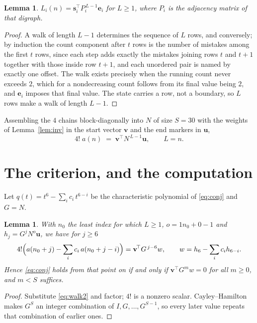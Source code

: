 \documentclass[11pt,a4paper]{article}
\theoremstyle{plain}
\newtheorem{lemma}[theorem]{Lemma}
\theoremstyle{definition}
\begin{document}
\begin{lemma}\label{lem:walk}
$L_i(n)=\mathbf{s}_i^{\!\top}P_i^{\,L-1}\mathbf{e}_i$ for $L\ge1$, where $P_i$ is the
adjacency matrix of that digraph.
\end{lemma}

\begin{proof}
A walk of length $L-1$ determines the sequence of $L$ rows, and conversely; by induction
the count component after $t$ rows is the number of mistakes among the first $t$ rows,
since each step adds exactly the mistakes joining rows $t$ and $t+1$ together with those
inside row $t+1$, and each unordered pair is named by exactly one offset. The walk exists
precisely when the running count never exceeds $2$, which for a nondecreasing count follows
from its final value being $2$, and $\mathbf{e}_i$ imposes that final value. The state
carries a row, not a boundary, so $L$ rows make a walk of length $L-1$.
\end{proof}

Assembling the $4$ chains block-diagonally into $N$ of size $S=30$ with the weights of
Lemma~\ref{lem:inv} in the start vector $\mathbf{v}$ and the end markers in
$\mathbf{u}$,
\begin{equation}\label{eq:walk2}
4!\;a(n)\;=\;\mathbf{v}^{\!\top}N^{\,L-1}\mathbf{u},\qquad L=n .
\end{equation}

\section{The criterion, and the computation}

Let $q(t)=t^{6}-\sum_i c_i\,t^{6-i}$ be the characteristic polynomial of
\eqref{eq:conj} and $G=N$.

\begin{lemma}\label{lem:crit}
With $n_0$ the least index for which $L\ge1$, $o=1n_0+0-1$ and
$h_j=G^{j}N^{o}\mathbf{u}$, we have for $j\ge6$
\[
4!\Bigl(a(n_0+j)-\sum_i c_i\,a(n_0+j-i)\Bigr)=\mathbf{v}^{\!\top}G^{\,j-6}w,
\qquad w=h_{6}-\sum_i c_ih_{6-i} .
\]
Hence \eqref{eq:conj} holds from that point on if and only if
$\mathbf{v}^{\!\top}G^{m}w=0$ for all $m\ge0$, and $m<S$ suffices.
\end{lemma}

\begin{proof}
Substitute \eqref{eq:walk2} and factor; $4!$ is a nonzero scalar. Cayley--Hamilton
makes $G^{S}$ an integer combination of $I,G,\dots,G^{S-1}$, so every later value repeats
that combination of earlier ones.
\end{proof}
\end{document}
